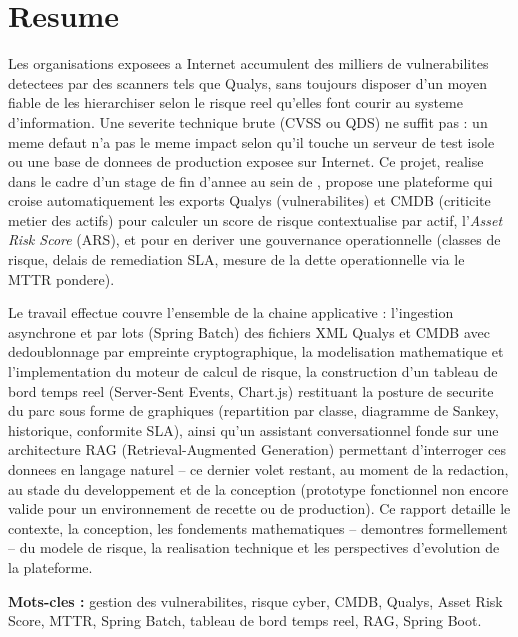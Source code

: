 \chapter*{Resume}

Les organisations exposees a Internet accumulent des milliers de vulnerabilites
detectees par des scanners tels que Qualys, sans toujours disposer d'un moyen fiable
de les hierarchiser selon le risque reel qu'elles font courir au systeme d'information.
Une severite technique brute (CVSS ou QDS) ne suffit pas : un meme defaut n'a pas le
meme impact selon qu'il touche un serveur de test isole ou une base de donnees de
production exposee sur Internet. Ce projet, realise dans le cadre d'un stage de fin
d'annee au sein de \organisme, propose une plateforme qui
croise automatiquement les exports Qualys (vulnerabilites) et CMDB (criticite metier
des actifs) pour calculer un score de risque contextualise par actif, l'\emph{Asset
Risk Score} (ARS), et pour en deriver une gouvernance operationnelle (classes de
risque, delais de remediation SLA, mesure de la dette operationnelle via le MTTR
pondere).

Le travail effectue couvre l'ensemble de la chaine applicative : l'ingestion
asynchrone et par lots (Spring Batch) des fichiers XML Qualys et CMDB avec
dedoublonnage par empreinte cryptographique, la modelisation mathematique et
l'implementation du moteur de calcul de risque, la construction d'un tableau de bord
temps reel (Server-Sent Events, Chart.js) restituant la posture de securite du parc
sous forme de graphiques (repartition par classe, diagramme de Sankey, historique,
conformite SLA), ainsi qu'un assistant conversationnel fonde sur une architecture RAG
(Retrieval-Augmented Generation) permettant d'interroger ces donnees en langage
naturel -- ce dernier volet restant, au moment de la redaction, au stade du
developpement et de la conception (prototype fonctionnel non encore valide pour un
environnement de recette ou de production). Ce rapport detaille le contexte, la conception, les fondements
mathematiques -- demontres formellement -- du modele de risque, la realisation
technique et les perspectives d'evolution de la plateforme.

\vspace{0.5cm}
\noindent\textbf{Mots-cles :} gestion des vulnerabilites, risque cyber, CMDB, Qualys,
Asset Risk Score, MTTR, Spring Batch, tableau de bord temps reel, RAG, Spring Boot.

\bigskip
\bigskip

